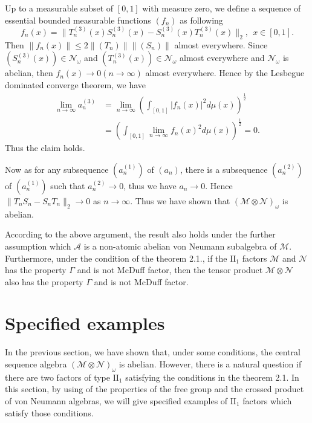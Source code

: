 \documentclass[12pt]{article}
\begin{document}
Up to a measurable subset of $[0,1]$ with measure zero, we define a
sequence of essential bounded measurable functions $(f_{n})$ as
following
$$f_{n}(x)=\|T_{n}^{(3)}(x)S_{n}^{(3)}(x)-S_{n}^{(3)}(x)T_{n}^{(3)}(x)\|_{2},\
\ x\in[0,1].$$ Then $\|f_{n}(x)\|\leq 2\|(T_{n})\|\|(S_{n})\|$
almost everywhere. Since $(S_{n}^{(3)}(x))\in\mathcal{N}_{\omega}$
and $(T_{n}^{(3)}(x))\in\mathcal{N}_{\omega}$ almost everywhere and
$\mathcal{N}_{\omega}$ is abelian, then $f_{n}(x)\rightarrow
0(n\rightarrow\infty)$ almost everywhere. Hence by the Lesbegue
dominated converge theorem, we have
\begin{align*}
\lim_{n\rightarrow\infty}a_{n}^{(3)}&=\lim_{n\rightarrow\infty}(\int_{[0,1]} |f_{n}(x)|^{2}d\mu(x))^{\frac{1}{2}}\\
&=(\int_{[0,1]}\lim_{n\rightarrow\infty}f_{n}(x)^{2}d\mu(x))^{\frac{1}{2}}=0.
\end{align*}
Thus the claim holds.

Now as for any subsequence $(a_{n}^{(1)})$ of $(a_{n})$, there is a
subsequence $(a_{n}^{(2)})$ of $(a_{n}^{(1)})$ such that
$a_{n}^{(2)}\rightarrow0$, thus we have $a_{n}\rightarrow 0$. Hence
$\|T_{n}S_{n}-S_{n}T_{n}\|_{2}\rightarrow 0$ as
$n\rightarrow\infty$. Thus we have shown that
$(\mathcal{M}\otimes\mathcal{N})_{\omega}$ is abelian.\endproof

\vskip6pt

 According to the above argument, the
result also holds under the further assumption which $\mathcal{A}$
is a non-atomic abelian von Neumann subalgebra of $\mathcal{M}$.
Furthermore, under the condition of the theorem 2.1., if the
$\mathrm{II}_{1}$ factors $\mathcal{M}$ and $\mathcal{N}$ has the
property $\Gamma$ and is not McDuff factor, then the tensor product
$\mathcal{M}\otimes\mathcal{N}$ also has the property $\Gamma$ and
is not McDuff factor.

\section{Specified examples}

In the previous section, we have shown that, under some conditions,
the central sequence algebra
$(\mathcal{M}\otimes\mathcal{N})_{\omega}$ is abelian. However,
there is a natural question if there are two factors of type
$\mathrm{II}_{1}$ satisfying the conditions in the theorem 2.1. In
this section, by using of the properties of the free group and the
crossed product of von Neumann algebras, we will give specified
examples of $\mathrm{II}_{1}$ factors which satisfy those
conditions.\vskip6pt
\end{document}
